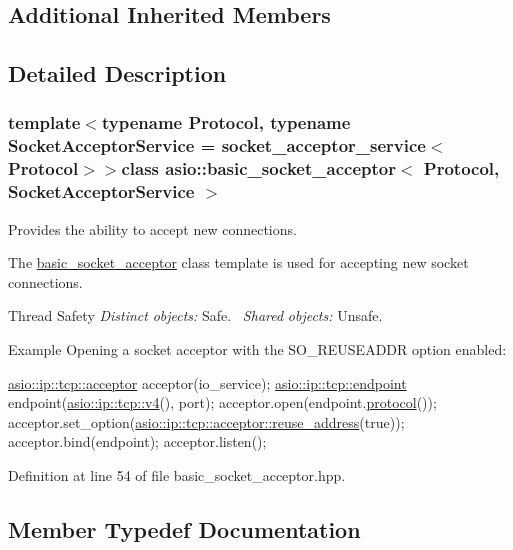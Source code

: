 \subsection*{Additional Inherited Members}


\subsection{Detailed Description}
\subsubsection*{template$<$typename Protocol, typename Socket\+Acceptor\+Service = socket\+\_\+acceptor\+\_\+service$<$\+Protocol$>$$>$class asio\+::basic\+\_\+socket\+\_\+acceptor$<$ Protocol, Socket\+Acceptor\+Service $>$}

Provides the ability to accept new connections. 

The \hyperlink{classasio_1_1basic__socket__acceptor}{basic\+\_\+socket\+\_\+acceptor} class template is used for accepting new socket connections.

\begin{DoxyParagraph}{Thread Safety}
{\itshape Distinct} {\itshape objects\+:} Safe.~\newline
{\itshape Shared} {\itshape objects\+:} Unsafe.
\end{DoxyParagraph}
\begin{DoxyParagraph}{Example}
Opening a socket acceptor with the S\+O\+\_\+\+R\+E\+U\+S\+E\+A\+D\+D\+R option enabled\+: 
\begin{DoxyCode}
\hyperlink{classasio_1_1basic__socket__acceptor}{asio::ip::tcp::acceptor} acceptor(io\_service);
\hyperlink{classasio_1_1ip_1_1basic__endpoint}{asio::ip::tcp::endpoint} endpoint(\hyperlink{classasio_1_1ip_1_1tcp_a5123c64b44b4c5fd3c016ce75cbf096d}{asio::ip::tcp::v4}(), port);
acceptor.open(endpoint.\hyperlink{classasio_1_1ip_1_1basic__endpoint_a5dd3cc452ad940d0bce8dd79bb0b58bc}{protocol}());
acceptor.set\_option(\hyperlink{classasio_1_1detail_1_1socket__option_1_1boolean}{asio::ip::tcp::acceptor::reuse\_address}(\textcolor{keyword}{true}));
acceptor.bind(endpoint);
acceptor.listen();
\end{DoxyCode}
 
\end{DoxyParagraph}


Definition at line 54 of file basic\+\_\+socket\+\_\+acceptor.\+hpp.



\subsection{Member Typedef Documentation}
\hypertarget{classasio_1_1basic__socket__acceptor_a393d69e2f8a370aaa13a9018af4c0048}{}
